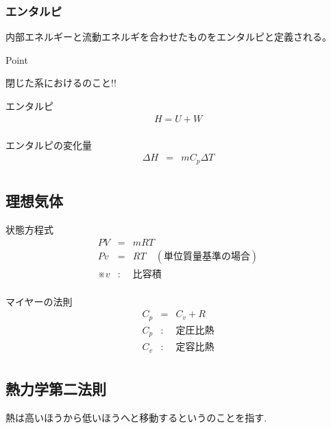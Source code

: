 \documentclass[a4paper]{jsarticle}
\begin{document}
\subsubsection{エンタルピ}
内部エネルギーと流動エネルギを合わせたものをエンタルピと定義される。
\begin{itembox}[l]{Point}
    \begin{center}
        閉じた系におけるのこと!!
    \end{center}
\end{itembox}
\begin{itembox}[l]{エンタルピ}
    \begin{eqnarray*}
        H=U+W\\
    \end{eqnarray*}
\end{itembox}
\begin{itembox}[l]{エンタルピの変化量}
    \begin{eqnarray*}
        \Delta H&=&mC_p\Delta T\\
    \end{eqnarray*}
\end{itembox}
\subsection{理想気体}
\begin{itembox}[l]{状態方程式}
    \begin{eqnarray*}
        PV&=&mRT\\
        Pv&=&RT\quad (単位質量基準の場合)\\
        ※v&:&比容積\\
    \end{eqnarray*}
\end{itembox}
\begin{itembox}[l]{マイヤーの法則}
    \begin{eqnarray*}
        C_p&=&C_v+R\\
        C_p&:&定圧比熱\\
        C_v&:&定容比熱\\
    \end{eqnarray*}
\end{itembox}
\subsection{熱力学第二法則}
\begin{screen}
    \begin{center}
        熱は高いほうから低いほうへと移動するというのことを指す.
    \end{center}
\end{screen}
\end{document}
